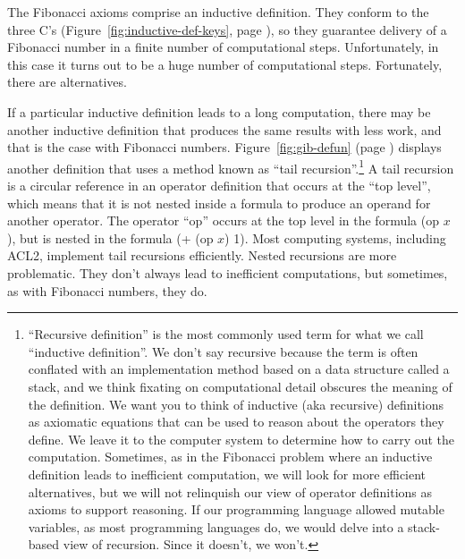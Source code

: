 The Fibonacci axioms comprise an
inductive definition.
They conform to the three C's
(Figure~\ref{fig:inductive-def-keys}, page \pageref{fig:inductive-def-keys}),
so they guarantee delivery of a Fibonacci number
in a finite number of computational steps.
Unfortunately, in this case it turns out to be
a huge number of computational steps.
Fortunately, there are alternatives.

If a particular inductive definition leads to a long computation,
there may be another inductive definition that produces the same
results with less work,
and that is the case with Fibonacci numbers.
Figure~\ref{fig:gib-defun} (page \pageref{fig:gib-defun})
displays another definition that uses a method known as
``tail recursion''.\footnote{``Recursive definition''
is the most commonly used term for what we call ``inductive definition''.
We don't say recursive because the term is often conflated
with an implementation method based on a data structure called a stack,
and we think fixating on computational detail obscures the meaning
of the definition.
We want you to think of inductive (aka recursive)
definitions as axiomatic equations that can be used to reason about the
operators they define. We leave it to the computer system
to determine how to carry out the computation. 
Sometimes, as in the Fibonacci problem
where an inductive definition leads to inefficient computation, 
we will look for more efficient alternatives,
but we will not relinquish our view of operator definitions
as axioms to support reasoning. If our programming language allowed
mutable variables, as most programming languages do, we would
delve into a stack-based view of recursion.
Since it doesn't, we won't.}
A tail recursion is a circular reference in an operator definition
that occurs at the
``top level'',
which means that it is not nested
inside a formula to produce an operand for
another operator. The operator ``op'' occurs at the top level
in the formula (op $x$), but is nested in the formula (+ (op $x$) 1).
Most computing systems, including ACL2,
implement tail recursions efficiently. Nested recursions are
more problematic. They don't always lead to inefficient computations,
but sometimes, as with Fibonacci numbers, they do.

